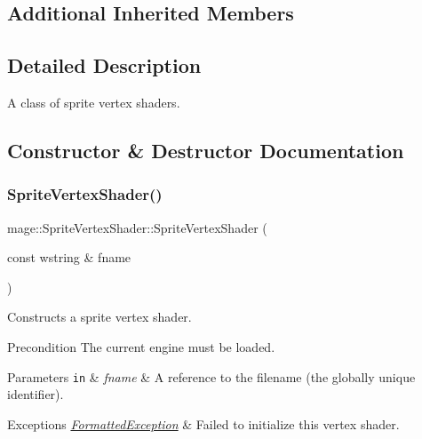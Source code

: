 \subsection*{Additional Inherited Members}


\subsection{Detailed Description}
A class of sprite vertex shaders. 

\subsection{Constructor \& Destructor Documentation}
\hypertarget{classmage_1_1_sprite_vertex_shader_a28c6186fc78d99f08af7e84338e5349f}{}\label{classmage_1_1_sprite_vertex_shader_a28c6186fc78d99f08af7e84338e5349f} 
\subsubsection{\texorpdfstring{Sprite\+Vertex\+Shader()}{SpriteVertexShader()}\hspace{0.1cm}{\footnotesize\ttfamily [1/6]}}
{\footnotesize\ttfamily mage\+::\+Sprite\+Vertex\+Shader\+::\+Sprite\+Vertex\+Shader (\begin{DoxyParamCaption}\item[{const wstring \&}]{fname }\end{DoxyParamCaption})\hspace{0.3cm}{\ttfamily [explicit]}}

Constructs a sprite vertex shader.

\begin{DoxyPrecond}{Precondition}
The current engine must be loaded. 
\end{DoxyPrecond}

\begin{DoxyParams}[1]{Parameters}
\mbox{\tt in}  & {\em fname} & A reference to the filename (the globally unique identifier). \\
\hline
\end{DoxyParams}

\begin{DoxyExceptions}{Exceptions}
{\em \hyperlink{structmage_1_1_formatted_exception}{Formatted\+Exception}} & Failed to initialize this vertex shader. \\
\hline
\end{DoxyExceptions}
\hypertarget{classmage_1_1_sprite_vertex_shader_ad79c6a83fe6ee5b9b4fa04181bff356f}{}\label{classmage_1_1_sprite_vertex_shader_ad79c6a83fe6ee5b9b4fa04181bff356f} 
